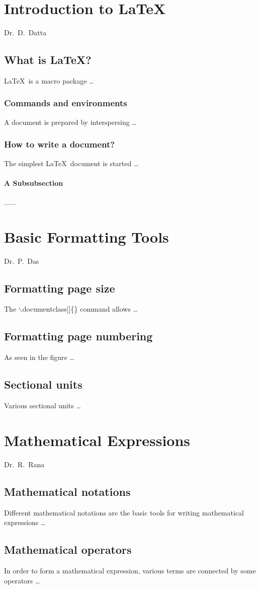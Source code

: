 \documentclass[a4paper,openany]{book}
\begin{document}
\dominitoc
{} %
\tableofcontents
%
\chapter[Introduction to \LaTeX\\{\it Dr.\ D.\ Datta}]{Introduction to \LaTeX}
\begin{flushright} Dr.\ D.\ Datta \end{flushright}
\minitoc
\section{What is \LaTeX?}
\LaTeX\ is a macro package …
\subsection{Commands and environments}
A document is prepared by interspersing …
\subsection{How to write a document?}
The simplest \LaTeX\ document is started …
\subsubsection{A Subsubsection}
......
%
\chapter[Basic Formatting Tools\\{\it Dr.\ P.\ Das}]{Basic Formatting Tools}
\begin{flushright} Dr.\ P.\ Das \end{flushright}
\minitoc
\section{Formatting page size}
The $\backslash$documentclass[]\{\} command allows …
\section{Formatting page numbering}
As seen in the figure …
\section{Sectional units}
Various sectional units …
%
\chapter[Mathematical Expressions\\{\it Dr.\ R.\ Rana}]{Mathematical Expressions}
\begin{flushright} Dr.\ R.\ Rana \end{flushright}
\minitoc
\section{Mathematical notations}
Different mathematical notations are the basic tools for writing mathematical expressions …
\section{Mathematical operators}
In order to form a mathematical expression, various terms are connected by some operators …
\end{document}
